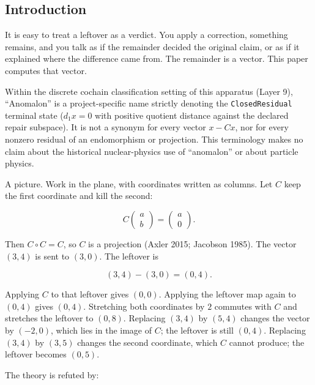\documentclass[
  11pt,
]{article}
\begin{document}
\subsection{Introduction}\label{introduction}

It is easy to treat a leftover as a verdict. You apply a correction, something remains, and you talk as if the remainder decided the original claim, or as if it explained where the difference came from. The remainder is a vector. This paper computes that vector.

Within the discrete cochain classification setting of this apparatus (Layer 9), ``Anomalon'' is a project-specific name strictly denoting the \texttt{ClosedResidual} terminal state (\(d_1 x = 0\) with positive quotient distance against the declared repair subspace). It is not a synonym for every vector \(x - Cx\), nor for every nonzero residual of an endomorphism or projection. This terminology makes no claim about the historical nuclear-physics use of ``anomalon'' or about particle physics.

A picture. Work in the plane, with coordinates written as columns. Let \(C\) keep the first coordinate and kill the second:

\[
C\begin{pmatrix}a\\b\end{pmatrix}
=
\begin{pmatrix}a\\0\end{pmatrix}.
\]

Then \(C\circ C=C\), so \(C\) is a projection (Axler 2015; Jacobson 1985). The vector \((3,4)\) is sent to \((3,0)\). The leftover is

\[
(3,4)-(3,0)=(0,4).
\]

Applying \(C\) to that leftover gives \((0,0)\). Applying the leftover map again to \((0,4)\) gives \((0,4)\). Stretching both coordinates by \(2\) commutes with \(C\) and stretches the leftover to \((0,8)\). Replacing \((3,4)\) by \((5,4)\) changes the vector by \((-2,0)\), which lies in the image of \(C\); the leftover is still \((0,4)\). Replacing \((3,4)\) by \((3,5)\) changes the second coordinate, which \(C\) cannot produce; the leftover becomes \((0,5)\).

The theory is refuted by:
\end{document}
